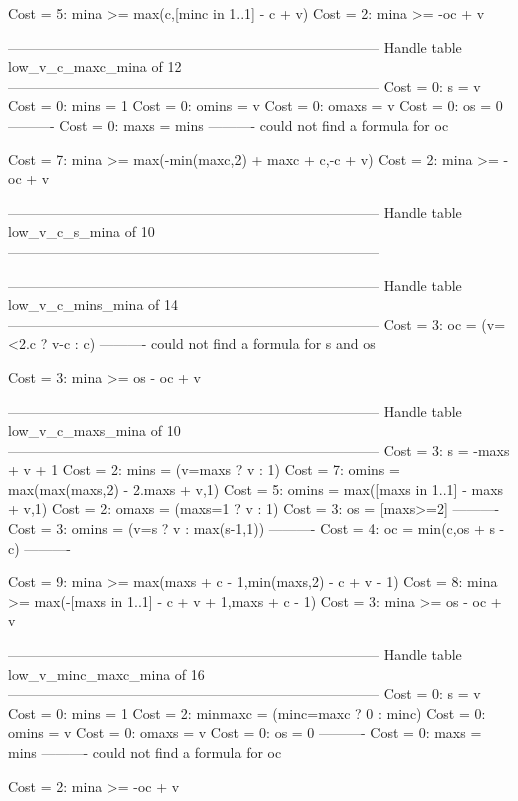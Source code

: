 Cost =  5:  mina >= max(c,[minc in 1..1] - c + v)
Cost =  2:  mina >= -oc + v

--------------------------------------------------------------------------------
Handle table low_v_c_maxc_mina of 12
--------------------------------------------------------------------------------
Cost =  0:  s     = v
Cost =  0:  mins  = 1
Cost =  0:  omins = v
Cost =  0:  omaxs = v
Cost =  0:  os    = 0
----------
Cost =  0:  maxs  = mins
----------
could not find a formula for oc

Cost =  7:  mina >= max(-min(maxc,2) + maxc + c,-c + v)
Cost =  2:  mina >= -oc + v

--------------------------------------------------------------------------------
Handle table low_v_c_s_mina of 10
--------------------------------------------------------------------------------


--------------------------------------------------------------------------------
Handle table low_v_c_mins_mina of 14
--------------------------------------------------------------------------------
Cost =  3:  oc = (v=<2.c ? v-c : c)
----------
could not find a formula for s and os

Cost =  3:  mina >= os - oc + v

--------------------------------------------------------------------------------
Handle table low_v_c_maxs_mina of 10
--------------------------------------------------------------------------------
Cost =  3:  s     = -maxs + v + 1
Cost =  2:  mins  = (v=maxs ? v : 1)
Cost =  7:  omins = max(max(maxs,2) - 2.maxs + v,1)
Cost =  5:  omins = max([maxs in 1..1] - maxs + v,1)
Cost =  2:  omaxs = (maxs=1 ? v : 1)
Cost =  3:  os    = [maxs>=2]
----------
Cost =  3:  omins = (v=s ? v : max(s-1,1))
----------
Cost =  4:  oc    = min(c,os + s - c)
----------

Cost =  9:  mina >= max(maxs + c - 1,min(maxs,2) - c + v - 1)
Cost =  8:  mina >= max(-[maxs in 1..1] - c + v + 1,maxs + c - 1)
Cost =  3:  mina >= os - oc + v

--------------------------------------------------------------------------------
Handle table low_v_minc_maxc_mina of 16
--------------------------------------------------------------------------------
Cost =  0:  s       = v
Cost =  0:  mins    = 1
Cost =  2:  minmaxc = (minc=maxc ? 0 : minc)
Cost =  0:  omins   = v
Cost =  0:  omaxs   = v
Cost =  0:  os      = 0
----------
Cost =  0:  maxs    = mins
----------
could not find a formula for oc

Cost =  2:  mina >= -oc + v

